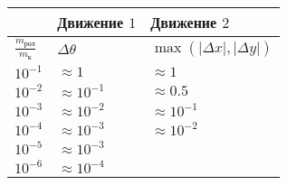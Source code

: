 \begin{table}[]
    \begin{tabular}{l|l|l}
     & Движение $1$ & Движение $2$ \\ \hline
    $\frac{m_{\text{рол}}}{m_{\text{к}}}$ &
    $\Delta \theta$ &
    $\max(|\Delta x|, |\Delta y|)$ \\ \hline
    $10^{-1}$ & $\approx 1$       & $\approx 1$       \\
    $10^{-2}$ & $\approx 10^{-1}$ & $\approx 0.5$     \\
    $10^{-3}$ & $\approx 10^{-2}$ & $\approx 10^{-1}$ \\
    $10^{-4}$ & $\approx 10^{-3}$ & $\approx 10^{-2}$ \\
    $10^{-5}$ & $\approx 10^{-3}$ &                   \\
    $10^{-6}$ & $\approx 10^{-4}$ & 
    \end{tabular}
\end{table}
